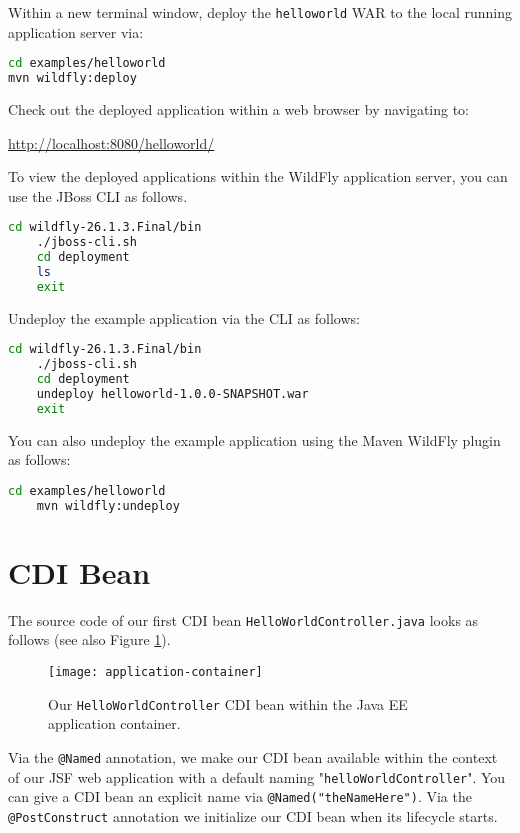 Within a new terminal window, deploy the \texttt{helloworld} WAR to the local running application server via:
\begin{lstlisting}[language=bash]
cd examples/helloworld
mvn wildfly:deploy
\end{lstlisting}
Check out the deployed application within a web browser by navigating to:

\url{http://localhost:8080/helloworld/}

To view the deployed applications within the WildFly application server, you can use the JBoss CLI as follows.
\begin{lstlisting}[language=bash]
	cd wildfly-26.1.3.Final/bin
	./jboss-cli.sh
	cd deployment
	ls
	exit
\end{lstlisting}

Undeploy the example application via the CLI as follows:
\begin{lstlisting}[language=bash]
	cd wildfly-26.1.3.Final/bin
	./jboss-cli.sh
	cd deployment
	undeploy helloworld-1.0.0-SNAPSHOT.war
	exit
\end{lstlisting}

You can also undeploy the example application using the Maven WildFly plugin as follows:
\begin{lstlisting}[language=bash]
	cd examples/helloworld
	mvn wildfly:undeploy
\end{lstlisting}


\section{CDI Bean}

The source code of our first CDI \cite{CDI2} bean \texttt{HelloWorldController.java} looks as follows (see also Figure \ref{fig:application-container}).
\begin{figure}[htbp]
	\begin{center}
		\texttt{[image: application-container]}
		\caption{Our \texttt{HelloWorldController} CDI bean within the Java EE application container.}
		\label{fig:application-container}
	\end{center}
\end{figure}

Via the \texttt{@Named} annotation, we make our CDI bean available within the context of our JSF web application with a default naming "\texttt{helloWorldController}".
You can give a CDI bean an explicit name via \texttt{@Named("theNameHere")}.
Via the \texttt{@PostConstruct} annotation we initialize our CDI bean when its lifecycle starts.

